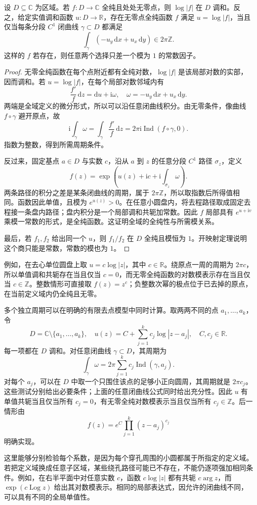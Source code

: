 \begin{proposition}\label{b3:prop:15-log-modulus}
设 \(D\subseteq\mathbb C\) 为区域。若 \(f:D\to\mathbb C\) 全纯且处处无零点，则 \(\log|f|\) 在 \(D\) 调和。反之，给定实值调和函数 \(u:D\to\mathbb R\)，存在无零点全纯函数 \(f\) 满足 \(u=\log|f|\)，当且仅当每条分段 \(C^1\) 闭曲线 \(\gamma\subset D\) 都满足
\[
 \int_\gamma(-u_y\,\mathrm dx+u_x\,\mathrm dy)\in2\pi\mathbb Z.
\]
这样的 \(f\) 若存在，则任意两个选择只差一个模为 \(1\) 的常数因子。
\end{proposition}
\begin{proof}
无零全纯函数在每个点附近都有全纯对数，\(\log|f|\) 是该局部对数的实部，因而调和。若 \(u=\log|f|\)，在每个局部对数邻域内有
\[
 \frac{f'}f\,\mathrm dz=\mathrm du+\mathrm i\omega,
 \quad \omega=-u_y\,\mathrm dx+u_x\,\mathrm dy.
\]
两端是全域定义的微分形式，所以可以沿任意闭曲线积分。由无零条件，像曲线 \(f\circ\gamma\) 避开原点，故
\[
 \mathrm i\int_\gamma\omega
 =\int_\gamma\frac{f'}f\,\mathrm dz
 =2\pi\mathrm i\operatorname{Ind}(f\circ\gamma,0).
\]
指数为整数，得到所需周期条件。

反过来，固定基点 \(a\in D\) 与实数 \(c\)，沿从 \(a\) 到 \(z\) 的任意分段 \(C^1\) 路径 \(\sigma_z\)，定义
\[
 f(z)=\exp\left(u(z)+\mathrm i c
                  +\mathrm i\int_{\sigma_z}\omega\right).
\]
两条路径的积分之差是某条闭曲线的周期，属于 \(2\pi\mathbb Z\)，所以取指数后所得值相同。函数因此单值，且模为 \(e^{u(z)}>0\)。在任意小圆盘内，将去程路径取成固定去程接一条盘内路径；盘内积分是一个局部调和共轭加常数。因此 \(f\) 局部具有 \(e^{u+\mathrm i v}\) 乘模一常数的形式，是全纯函数。这证明全域的全纯性与所需模关系。

最后，若 \(f_1,f_2\) 给出同一个 \(u\)，则 \(f_1/f_2\) 在 \(D\) 全纯且模恒为 \(1\)。开映射定理说明这个商只能是常数，常数的模也为 \(1\)。
\end{proof}

例如，在去心单位圆盘上取 \(u=c\log|z|\)，其中 \(c\in\mathbb R\)。绕原点一周的周期为 \(2\pi c\)，所以单值调和共轭存在当且仅当 \(c=0\)，而无零全纯函数的对数模表示存在当且仅当 \(c\in\mathbb Z\)。整数情形可直接取 \(f(z)=z^c\)；负整数次幂的极点位于已去掉的原点，在当前定义域内仍全纯且无零。

\ProseParagraphBreak
多个独立周期可以在明确的有限去点模型中同时计算。取两两不同的点 \(a_1,\ldots,a_k\)，令
\[
 D=\mathbb C\setminus\{a_1,\ldots,a_k\},
 \quad u(z)=C+\sum_{j=1}^k c_j\log|z-a_j|,
 \quad C,c_j\in\mathbb R.
\]
每一项都在 \(D\) 调和。对任意闭曲线 \(\gamma\subset D\)，其周期为
\[
 \int_\gamma\omega
 =2\pi\sum_{j=1}^k c_j\operatorname{Ind}(\gamma,a_j).
\]
对每个 \(a_j\)，可以在 \(D\) 中取一个只围住该点的足够小正向圆周，其周期就是 \(2\pi c_j\)。这些测试分别给出必要条件；上面的任意闭曲线公式同时给出充分性。因此 \(u\) 有单值共轭当且仅当所有 \(c_j=0\)，有无零全纯对数模表示当且仅当所有 \(c_j\in\mathbb Z\)。后一情形由
\[
 f(z)=e^C\prod_{j=1}^k(z-a_j)^{c_j}
\]
明确实现。

\ProseParagraphBreak
这里能够分别检验每个系数，是因为每个穿孔周围的小圆都属于所指定的定义域。若把定义域换成任意子区域，某些绕孔路径可能已不存在，不能仍逐项强加相同条件。例如，在右半平面中对任意实数 \(c\)，函数 \(c\log|z|\) 都有共轭 \(c\arg z\)，而 \(\exp(c\operatorname{Log}z)\) 给出其对数模表示。相同的局部表达式，因允许的闭曲线不同，可以具有不同的全局单值性。
